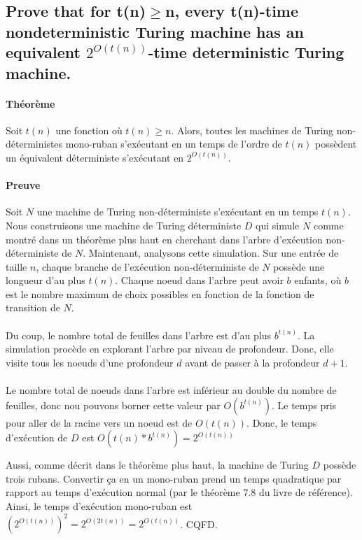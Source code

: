 \subsection{Prove that for t(n)$\geq$n, every t(n)-time nondeterministic Turing machine has an equivalent
$2^{O(t(n))}$-time deterministic Turing machine.}
\paragraph{Théorème } Soit $t(n)$ une fonction où $t(n) \geq n$. Alors, toutes les machines de Turing non-déterministes mono-ruban s'exécutant en un temps de l'ordre de $t(n)$ possèdent un équivalent déterministe s'exécutant en $2^{O(t(n))}$.

\paragraph{Preuve} Soit $N$ une machine de Turing non-déterministe s'exécutant en un temps $t(n)$. Nous construisons une machine de Turing déterministe $D$ qui simule $N$ comme montré dans un théorème plus haut en cherchant dans l'arbre d'exécution non-déterministe de $N$. Maintenant, analysons cette simulation. Sur une entrée de taille $n$, chaque branche de l'exécution non-déterministe de $N$ possède une longueur d'au plus $t(n)$. Chaque noeud dans l'arbre peut avoir $b$ enfants, où $b$ est le nombre maximum de choix possibles en fonction de la fonction de transition de $N$.
\paragraph{}
Du coup, le nombre total de feuilles dans l'arbre est d'au plus $b^{t(n)}$. La simulation procède en explorant l'arbre par niveau de profondeur. Donc, elle visite tous les noeuds d'une profondeur $d$ avant de passer à la profondeur $d+1$. 
\paragraph{}
Le nombre total de noeuds dans l'arbre est inférieur au double du nombre de feuilles, donc nou pouvons borner cette valeur par $O(b^{t(n)})$. Le temps pris pour aller de la racine vers un noeud est de $O(t(n))$. Donc, le temps d'exécution de $D$ est $O(t(n) * b^{t(n)}) = 2^{O(t(n))}$

Aussi, comme décrit dans le théorème plus haut, la machine de Turing $D$ possède trois rubans. Convertir ça en un mono-ruban prend un temps quadratique par rapport au temps d'exécution normal (par le théorème 7.8 du livre de référence). Ainsi, le temps d'exécution mono-ruban est $(2^{O(t(n))})^{2} = 2^{O(2t(n))} = 2^{O(t(n))}$. CQFD.

